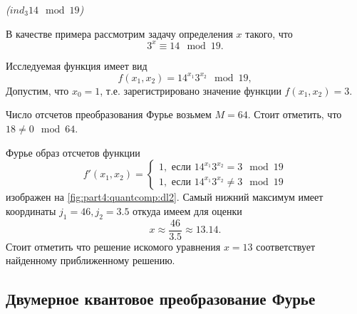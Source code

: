 \begin{example}
\emph{($ind_3{14} \mod{19}$)}
%

В качестве примера рассмотрим задачу определения $x$ такого, что 
\[
3^x \equiv 14 \mod 19.
\]

Исследуемая функция имеет вид
\[
f(x_1, x_2) = 14^{x_1} 3^{x_2} \mod 19,
\]
Допустим, что $x_0 = 1$, т.е. зарегистрировано значение функции
$f(x_1, x_2) = 3$.



Число отсчетов преобразования Фурье возьмем $M=64$. Стоит отметить,
что $18 \ne 0 \mod 64$.

Фурье образ отсчетов функции 
\[
f'(x_1, x_2) = 
\begin{cases}
1, \mbox{ если } 14^{x_1} 3^{x_2} = 3 \mod 19 \\
1, \mbox{ если } 14^{x_1} 3^{x_2} \ne 3 \mod 19 
\end{cases}
\]
изображен на \autoref{fig:part4:quantcomp:dl2}. Самый нижний максимум
имеет координаты $j_1 = 46, j_2 = 3.5$ откуда имеем для оценки 
\[
x \approx \frac{46}{3.5} \approx 13.14.
\]
Стоит отметить что решение искомого уравнения $x = 13$ соответствует
найденному приближенному решению.
\label{ex:part4:quantcomp:discretlog:periodfinding2}
\end{example}



\subsection{Двумерное квантовое преобразование Фурье}



